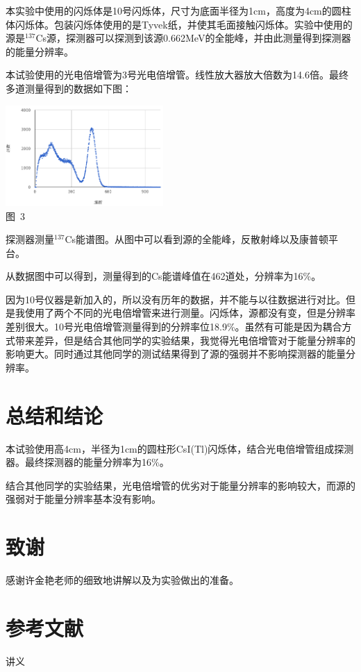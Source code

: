 \documentclass[a4paper,10.0pt,twoside]{npr}
\begin{document}
\begin{multicols}{2}
本实验中使用的闪烁体是10号闪烁体，尺寸为底面半径为1cm，高度为4cm的圆柱体闪烁体。包装闪烁体使用的是Tyvek纸，并使其毛面接触闪烁体。实验中使用的源是$^{137}$Cs源，探测器可以探测到该源0.662MeV的全能峰，并由此测量得到探测器的能量分辨率。

本试验使用的光电倍增管为3号光电倍增管。线性放大器放大倍数为14.6倍。最终多道测量得到的数据如下图：

\begin{center}
   \includegraphics[width=0.45\textwidth]{jishu.png}
\\
\xiaowu\song 图~3\begin{minipage}[t]{75mm} \quad 探测器测量$^{137}$Cs能谱图。从图中可以看到源的全能峰，反散射峰以及康普顿平台。\\[-1mm]\wuhao
\end{minipage}
\end{center}

从数据图中可以得到，测量得到的Cs能谱峰值在462道处，分辨率为16\%。

因为10号仪器是新加入的，所以没有历年的数据，并不能与以往数据进行对比。但是我使用了两个不同的光电倍增管来进行测量。闪烁体，源都没有变，但是分辨率差别很大。10号光电倍增管测量得到的分辨率位18.9\%。虽然有可能是因为耦合方式带来差异，但是结合其他同学的实验结果，我觉得光电倍增管对于能量分辨率的影响更大。同时通过其他同学的测试结果得到了源的强弱并不影响探测器的能量分辨率。

\section{总结和结论}
本试验使用高4cm，半径为1cm的圆柱形CsI(Tl)闪烁体，结合光电倍增管组成探测器。最终探测器的能量分辨率为16\%。

结合其他同学的实验结果，光电倍增管的优劣对于能量分辨率的影响较大，而源的强弱对于能量分辨率基本没有影响。

\section{致谢}
感谢许金艳老师的细致地讲解以及为实验做出的准备。
\section{参考文献}

\noindent
[1] 讲义
\end{multicols}
\end{document}
